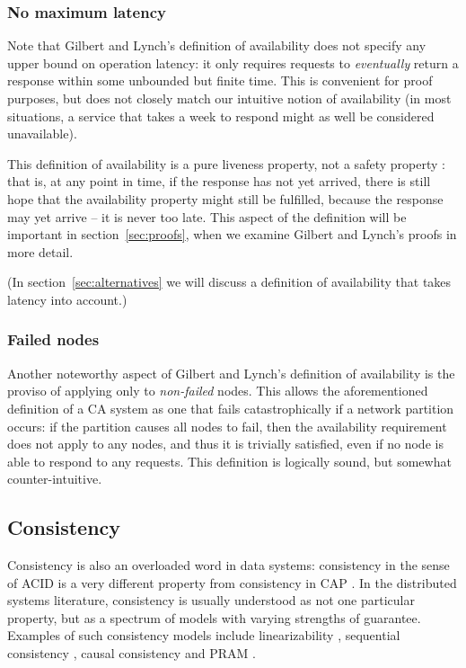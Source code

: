 \documentclass[fleqn,12pt,lineno]{wlpeerj} %
\begin{document}
\subsubsection{No maximum latency}\label{sec:no-max-latency}

Note that Gilbert and Lynch's definition of availability does not specify any upper bound on
operation latency: it only requires requests to \emph{eventually} return a response within some
unbounded but finite time. This is convenient for proof purposes, but does not closely match our
intuitive notion of availability (in most situations, a service that takes a week to respond might
as well be considered unavailable).

This definition of availability is a pure liveness property, not a safety property
\citep{Alpern1985dg}: that is, at any point in time, if the response has not yet arrived,
there is still hope that the availability property might still be fulfilled, because the response
may yet arrive -- it is never too late. This aspect of the definition will be important in
section~\ref{sec:proofs}, when we examine Gilbert and Lynch's proofs in more detail.

(In section~\ref{sec:alternatives} we will discuss a definition of availability that takes latency
into account.)

\subsubsection{Failed nodes}\label{sec:failed-node-exception}

Another noteworthy aspect of Gilbert and Lynch's definition of availability is the proviso of
applying only to \emph{non-failed} nodes. This allows the aforementioned definition of a CA system
as one that fails catastrophically if a network partition occurs: if the partition causes all nodes
to fail, then the availability requirement does not apply to any nodes, and thus it is trivially
satisfied, even if no node is able to respond to any requests. This definition is logically sound,
but somewhat counter-intuitive.

\subsection{Consistency}\label{sec:consistency}

Consistency is also an overloaded word in data systems: consistency in the sense of ACID is a very
different property from consistency in CAP \citep{Brewer2012ba}. In the distributed systems
literature, consistency is usually understood as not one particular property, but as a spectrum of
models with varying strengths of guarantee. Examples of such consistency models include
linearizability \citep{Herlihy1990jq}, sequential consistency \citep{Lamport1979ky}, causal
consistency \citep{Ahamad1995gl} and PRAM \citep{Lipton1988uh}.
\end{document}
